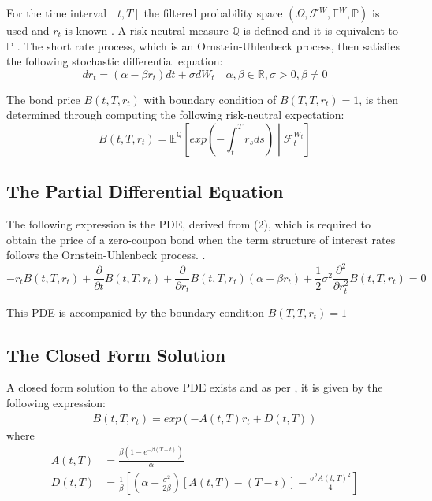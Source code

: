 \documentclass[12pt,a4paper]{article}
\begin{document}
For the time interval $[t,T]$ the filtered probability space $(\Omega, \mathcal{F}^W,\mathbb{F}^W,\mathbb{P})$ is used and $r_t$ is known \citep{mamon2004three}. A risk neutral measure $\mathbb{Q}$ is defined and it is equivalent to $\mathbb{P}$ \citep{shreve2004stochastic}. The short rate process, which is an Ornstein-Uhlenbeck process, then satisfies the following stochastic differential equation: 
\begin{equation}
dr_{t} = (\alpha-\beta r_{t})dt + \sigma dW_{t} \quad \alpha, \beta \in \mathbb{R}, \sigma>0, \beta \neq 0
\end{equation}


The bond price $B(t,T,r_t)$ with boundary condition of $B(T,T,r_t) = 1$, is then determined through computing the following risk-neutral expectation:
\begin{equation}
B(t,T,r_t) = \mathbb{E}^{\mathbb{Q}}\left[exp\left(-\int_{t}^{T}r_{s} ds\right)\middle\vert\mathcal{F}_{t}^{W_{t}}\right]
\end{equation}


\subsection{The Partial Differential Equation}
\label{subsec: PDE}
The following expression is the PDE, derived from (2), which is required to obtain the price of a zero-coupon bond when the term structure of interest rates follows the Ornstein-Uhlenbeck process. .
$$\boxed{-r_t B(t,T,r_t) + \frac{\partial}{\partial t} B(t,T,r_t) + \frac{\partial}{\partial r_t}B(t,T,r_t)(\alpha - \beta r_t) +\frac{1}{2} \sigma^2 \frac{\partial^2}{\partial r_t^2} B(t,T,r_t) = 0 }$$

\noindent This PDE is accompanied by the boundary condition $B(T,T,r_t) = 1$
\subsection{The Closed Form Solution}
\label{subsec: Closed Form}

A closed form solution to the above PDE exists and as per \cite{mamon2004three}, it is given by the following expression:
\begin{gather*}
\boxed{B(t,T,r_t) =exp(-A(t,T)r_t+D(t,T))}
\end{gather*}
where
\begin{align*}
A(t,T)&=\frac{\beta(1-e^{-\beta(T-t)})}{\alpha}\\
D(t,T)&=\frac{1}{\beta}\left[\left(\alpha-\frac{\sigma^2}{2\beta}\right)[A(t,T)-(T-t)]-\frac{\sigma^2A(t,T)^2}{4}\right]
\end{align*}
\end{document}
